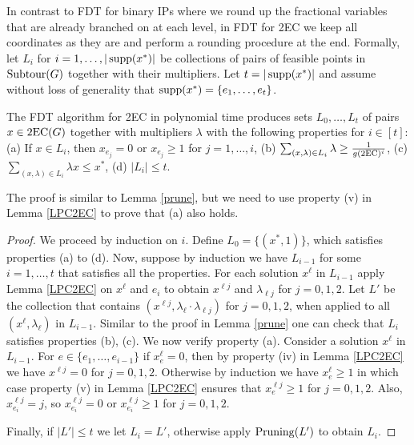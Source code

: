 In contrast to FDT for binary IPs where we round up the fractional variables that are already branched on at each level, in FDT for 2EC we keep all coordinates as they are and perform a rounding procedure at the end. Formally, let $L_i$ for $i=1,\ldots,|\operatorname{supp}(x^*)|$ be collections of pairs of feasible points in $\operatorname{{Subtour}}(G)$ together with their multipliers. Let $t=|\operatorname{supp}(x^*)|$ and assume without loss of generality that $\operatorname{supp}(x^*)=\{e_1,\ldots,e_t\}$. 

\begin{lemma}\label{2ecpruning}
	The FDT algorithm for 2EC in  polynomial time produces sets $L_0,\ldots,L_t$ of pairs $x\in \2ec(G)$ together with multipliers $\lambda$ with the following properties for $i\in [t]$:
	(a) If $x\in L_i$, then $x_{e_j}=0$ or $x_{e_j}\geq 1$ for $j=1,\ldots,i$, (b) $\sum_{(x,\lambda)\in L_i }\lambda \geq \frac{1}{g(\2ec)^i}$, (c) $\sum_{(x,\lambda)\in L_i }\lambda x \leq x^*$, (d) $|L_i|\leq t$.
\end{lemma}
The proof is similar to Lemma \ref{prune}, but we need to use property (v) in Lemma \ref{LPC2EC} to prove that (a) also holds.
\begin{proof}
	We proceed by induction on $i$. Define $L_0=\{(x^*,1)\}$, which satisfies properties (a) to (d). Now, suppose by induction we have $L_{i-1}$ for some $i=1,\ldots,t$ that satisfies all the properties. For each solution $x^\ell$ in $L_{i-1}$ apply Lemma \ref{LPC2EC} on $x^\ell$ and $e_{i}$ to obtain $x^{\ell j}$ and $\lambda_{\ell j}$ for $j=0,1,2$. Let $L'$ be the collection that contains $(x^{\ell j},\lambda_\ell \cdot \lambda_{\ell j})$ for $j=0,1,2$, when applied to all $(x^\ell,\lambda_\ell)$ in $L_{i-1}$. Similar to the proof in Lemma \ref{prune} one can check that $L_i$ satisfies properties (b), (c). We now verify property (a). Consider a solution $x^\ell$ in $L_{i-1}$. For $e\in \{e_1,\ldots,e_{i-1}\}$ if $x^\ell_e =0$, then by property (iv) in Lemma \ref{LPC2EC} we have $x^{\ell j}=0$ for $j=0,1,2$. Otherwise by induction we have $x^{\ell}_{e}\geq 1$ in which case property (v) in Lemma \ref{LPC2EC} ensures that $x^{\ell j}_e\geq 1$ for $j=0,1,2$. Also, $x^{\ell j}_{e_i}= j$, so $x^{\ell j}_{e_i}=0$ or $x^{\ell j}_{e_i}\geq 1$ for $j=0,1,2$. 
	
	Finally, if $|L'|\leq t$ we let $L_i=L'$, otherwise apply $\operatorname{{{Pruning}}}(L')$ to obtain $L_{i}$.
\end{proof}

